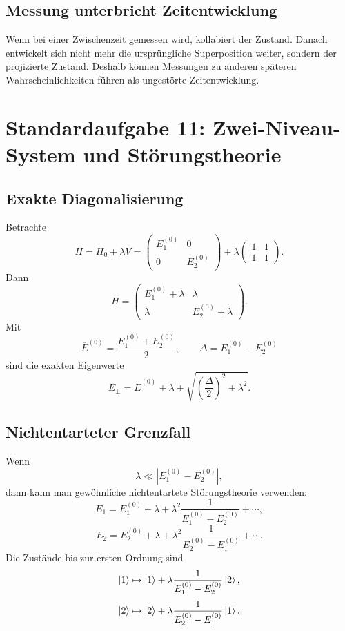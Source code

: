 \subsection{Messung unterbricht Zeitentwicklung}

Wenn bei einer Zwischenzeit gemessen wird, kollabiert der Zustand. Danach entwickelt sich nicht mehr die ursprüngliche Superposition weiter, sondern der projizierte Zustand. Deshalb können Messungen zu anderen späteren Wahrscheinlichkeiten führen als ungestörte Zeitentwicklung.

\section{Standardaufgabe 11: Zwei-Niveau-System und Störungstheorie}

\subsection{Exakte Diagonalisierung}

Betrachte
\[
    H=H_0+\lambda V
    =\begin{pmatrix}E_1^{(0)}&0\\0&E_2^{(0)}\end{pmatrix}
    +\lambda\begin{pmatrix}1&1\\1&1\end{pmatrix}.
\]
Dann
\[
    H=\begin{pmatrix}E_1^{(0)}+\lambda&\lambda\\\lambda&E_2^{(0)}+\lambda\end{pmatrix}.
\]
Mit
\[
    \overline E^{(0)}=\frac{E_1^{(0)}+E_2^{(0)}}{2},
    \qquad
    \Delta=E_1^{(0)}-E_2^{(0)}
\]
sind die exakten Eigenwerte
\[
    E_\pm=\overline E^{(0)}+\lambda
    \pm\sqrt{\left(\frac{\Delta}{2}\right)^2+\lambda^2}.
\]

\subsection{Nichtentarteter Grenzfall}

Wenn
\[
    \lambda\ll |E_1^{(0)}-E_2^{(0)}|,
\]
dann kann man gewöhnliche nichtentartete Störungstheorie verwenden:
\[
    E_1=E_1^{(0)}+\lambda+\lambda^2\frac{1}{E_1^{(0)}-E_2^{(0)}}+\cdots,
\]
\[
    E_2=E_2^{(0)}+\lambda+\lambda^2\frac{1}{E_2^{(0)}-E_1^{(0)}}+\cdots.
\]
Die Zustände bis zur ersten Ordnung sind
\[
    \left|1\right\rangle\mapsto \left|1\right\rangle+\lambda\frac{1}{E_1^{(0)}-E_2^{(0)}}\left|2\right\rangle,
\]
\[
    \left|2\right\rangle\mapsto \left|2\right\rangle+\lambda\frac{1}{E_2^{(0)}-E_1^{(0)}}\left|1\right\rangle.
\]

